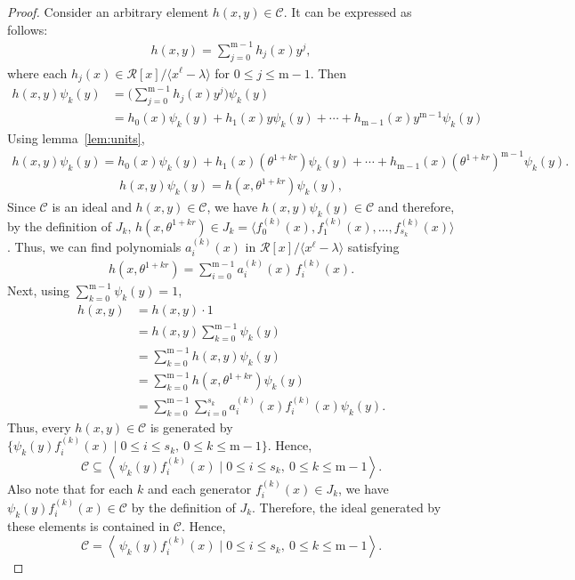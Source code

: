 \documentclass[12pt,a4paper]{article}
\begin{document}
\begin{proof}
Consider an arbitrary element $h(x,y)\in \mathscr{C}$. It can be expressed as follows:
\begin{align*}
    h(x,y)=\sum_{j=0}^{\mathrm{m}-1}h_j(x)y^j,
\end{align*}
where each $h_j(x)\in \mathcal{R}[x]/\langle x^{\ell}-\lambda\rangle$ for $0 \le j \le \mathrm{m}-1$. Then
\begin{align*}
h(x,y)\psi_k(y)&=\Big(\sum_{j=0}^{\mathrm{m}-1}h_j(x)y^j\Big)\psi_k(y)\\
&=h_0(x)\psi_k(y)+h_1(x)y\psi_k(y)+\cdots+h_{\mathrm{m}-1}(x)y^{\mathrm{m}-1}\psi_k(y)
\end{align*}
Using lemma~\ref{lem:units},
\begin{align*}
h(x,y)\psi_k(y)=h_0(x)\psi_k(y)+h_1(x)(\theta^{1+kr})\psi_k(y)+\cdots+h_{\mathrm{m}-1}(x)(\theta^{1+kr})^{\mathrm{m}-1}\psi_k(y).
\end{align*}
\begin{align*}
h(x,y)\psi_k(y)= h(x,\theta^{1+kr})\psi_k(y),
\end{align*}
Since $\mathscr{C}$ is an ideal and $h(x,y)\in\mathscr{C}$, we have
$h(x,y)\psi_k(y)\in\mathscr{C}$ and therefore, by the definition of $J_k$, $h(x,\theta^{1+kr}) \in J_k = \langle f_0^{(k)}(x),f_1^{(k)}(x), \dots , f_{s_k}^{(k)}(x) \rangle$. Thus, we can find polynomials $a_i^{(k)}(x)$ in
$\mathcal{R}[x]/\langle x^{\ell}-\lambda\rangle$ satisfying
\begin{align*}
h(x,\theta^{1+kr})=\sum_{i=0}^{\mathrm{m}-1} a_i^{(k)}(x)\,f_i^{(k)}(x).
\end{align*}
Next, using $\sum_{k=0}^{\mathrm{m}-1}\psi_k(y)=1$,
\begin{align*}
h(x,y) &=h(x,y)\cdot 1 \\
&=h(x,y)\sum_{k=0}^{\mathrm{m}-1}\psi_k(y)\\
&=\sum_{k=0}^{\mathrm{m}-1} h(x,y)\psi_k(y)\\
&=\sum_{k=0}^{\mathrm{m}-1} h(x,\theta^{1+kr})\psi_k(y)\\
&= \sum_{k=0}^{\mathrm{m}-1} \sum_{i=0}^{s_k} a_i^{(k)}(x)f_i^{(k)}(x)\psi_k(y).
\end{align*}
Thus, every $h(x,y)\in\mathscr{C}$ is generated by $\Big\{\psi_k(y)f_i^{(k)}(x) \mid 0 \le i \le s_k, \ 0\le k\le \mathrm{m}-1\Big\}$.
Hence,
\[
\mathscr{C}\subseteq
\left\langle\, \psi_k(y)f_i^{(k)}(x) \mid 0 \le i \le s_k, \ 0\le k\le \mathrm{m}-1\right\rangle.
\]
Also note that for each $k$ and each generator $f_i^{(k)}(x)\in J_k$,
we have $\psi_k(y)f_i^{(k)}(x)\in \mathscr{C}$ by the definition of $J_k$.
Therefore, the ideal generated by these elements is contained in $\mathscr{C}$. Hence,
\[
\mathscr{C} =
\left\langle\, \psi_k(y)f_i^{(k)}(x) \mid 0 \le i \le s_k, \ 0\le k\le \mathrm{m}-1\right\rangle.
\]

\end{proof}
\end{document}
